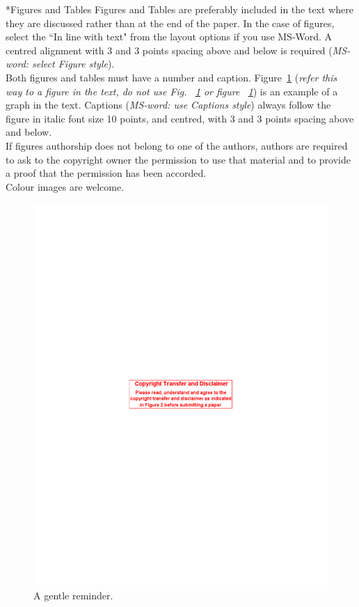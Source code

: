 \documentclass[twocolumn, a4paper,10pt]{article}
\makeatletter
\renewcommand\subsection{\@startsection{subsection}{1}{\z@}{\z@}{\z@}{\normalfont\normalsize\bfseries}}
\renewcommand\subsection{\@startsection{subsection}{1}{\z@}{\z@}{0.1pt}{\normalfont\normalsize\bfseries}}
\makeatother
\begin{document}
\subsection*{Figures and Tables}
Figures and Tables are preferably included in the text where they are discussed rather than at the end of the paper. In the case of figures, select the ``In line with text" from the layout options if you use MS-Word. A centred alignment with 3 and 3 points spacing above and below is required (\textit{MS-word: select \textit{Figure style}}). \\
Both figures and tables must have a number and caption. Figure~\ref{fig:fig01} (\textit{refer this way to a figure in the text, do not use Fig. ~\ref{fig:fig01} or figure ~\ref{fig:fig01}}) is an example of a graph in the text. Captions (\textit{MS-word: use \textit{Captions style}}) always follow the figure in italic font size 10 points, and centred, with 3 and 3 points spacing above and below.\\
If figures authorship does not belong to one of the authors, authors are required to ask to the copyright owner the permission to use that material and to provide a proof that the permission has been accorded.\\
Colour images are welcome.\\
\begin{figure}
\centering
\includegraphics[scale=1.0]{img/fig1.pdf}
\caption{A gentle reminder.}
\label{fig:fig01}
\vspace{-16pt}   %
\end{figure}
\end{document}
